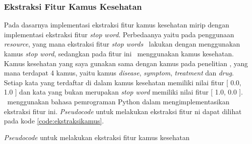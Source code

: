 \subsubsection{Ekstraksi Fitur Kamus Kesehatan}
Pada dasarnya implementasi ekstraksi fitur kamus kesehatan mirip dengan implementasi ekstraksi fitur \textit{stop word}. Perbedaanya yaitu pada penggunaan \textit{resource}, yang mana ekstraksi fitur \textit{stop words} \saya~lakukan dengan menggunakan kamus \textit{stop word}, sedangkan pada fitur ini \saya~menggunakan kamus kesehatan. Kamus kesehatan yang saya gunakan sama dengan kamus pada penelitian \cite{skripsiKakRadit}, yang mana terdapat 4 kamus, yaitu kamus \textit{disease}, \textit{symptom}, \textit{treatment} dan \textit{drug}. Setiap kata yang terdaftar di dalam kamus kesehatan memiliki nilai fitur [ 0.0, 1.0 ] dan kata yang bukan merupakan \textit{stop word} memiliki nilai fitur [ 1.0, 0.0 ]. \Saya~menggunakan bahasa pemrograman Python dalam mengimplementasikan ekstraksi fitur ini. \textit{Pseudocode} untuk melakukan ekstraksi fitur ni dapat dilihat pada kode \ref{code:ekstraksikamus}.

\begin{kode}

	
	\SetAlgoLined
	\BlankLine
	
	
	\caption{\textit{Pseudocode} untuk melakukan ekstraksi fitur kamus kesehatan}
	\label{code:ekstraksikamus}	
\end{kode}

